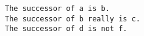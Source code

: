 \begin{verbatim}
The successor of a is b.
The successor of b really is c.
The successor of d is not f.
\end{verbatim}
